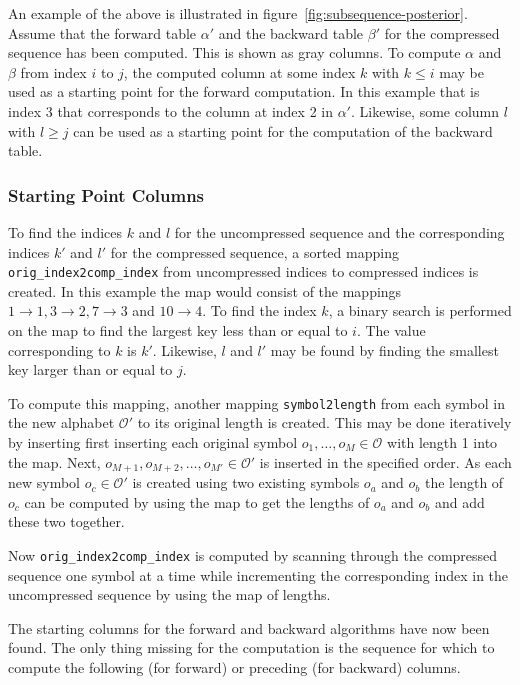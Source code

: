 An example of the above is illustrated in
figure~\ref{fig:subsequence-posterior}. Assume that the forward table $\alpha'$
and the backward table $\beta'$ for the compressed sequence has been computed.
This is shown as gray columns. To compute $\alpha$ and $\beta$ from index $i$
to $j$, the computed column at some index $k$ with $k \le i$ may be used as a
starting point for the forward computation. In this example that is index 3
that corresponds to the column at index 2 in $\alpha'$. Likewise, some column
$l$ with $l \ge j$ can be used as a starting point for the
computation of the backward table.

\subsubsection{Starting Point Columns}

To find the indices $k$ and $l$ for the uncompressed sequence and the
corresponding indices $k'$ and $l'$ for the compressed sequence, a sorted
mapping \texttt{orig\_index2comp\_index} from uncompressed indices to
compressed indices is created. In this example the map would consist of the
mappings $1 \rightarrow 1, 3 \rightarrow 2, 7 \rightarrow 3$ and
$10 \rightarrow 4$. To find the index $k$, a binary search is performed on the
map to find the largest key less than or equal to $i$. The value corresponding
to $k$ is $k'$. Likewise, $l$ and $l'$ may be found by finding the smallest key
larger than or equal to $j$.

To compute this mapping, another mapping \texttt{symbol2length} from each
symbol in the new alphabet $\mathcal{O'}$ to its original length is
created. This may be done iteratively by inserting first inserting each
original symbol $o_1, \dots, o_M \in \mathcal{O}$ with length 1 into the
map. Next, $o_{M+1}, o_{M+2}, \dots, o_{M'} \in \mathcal{O'}$ is inserted in
the specified order. As each new symbol $o_c \in \mathcal{O'}$ is created using
two existing symbols $o_a$ and $o_b$ the length of $o_c$ can be computed by
using the map to get the lengths of $o_a$ and $o_b$ and add these two
together.

Now \texttt{orig\_index2comp\_index} is computed by scanning through the
compressed sequence one symbol at a time while incrementing the corresponding
index in the uncompressed sequence by using the map of lengths.

The starting columns for the forward and backward algorithms have now been
found. The only thing missing for the computation is the sequence for which to
compute the following (for forward) or preceding (for backward) columns.

